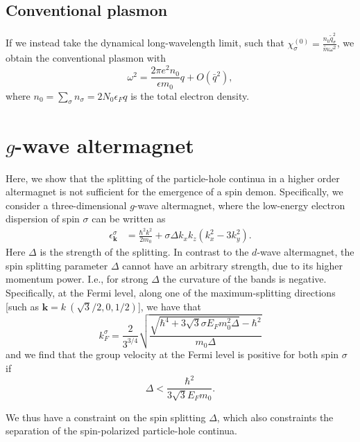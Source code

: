 \documentclass[aps,prb,reprint,twocolumns,superscriptaddress,nofootinbib]{revtex4-2}
\newcommand{\mdos}{\tilde{m}}
\newcommand{\kF}{k_{F}}
\begin{document}
	\subsection{Conventional plasmon}
	If we instead take the dynamical long-wavelength limit, such that $\chi_{\sigma}^{(0)}=\frac{n_0 \tilde q_\sigma^2}{\mdos \omega^2}$, we obtain the conventional plasmon with
	\begin{equation}
		\omega^2 = \frac{2\pi e^2n_0}{\epsilon m_0} q + O(\bar q^2),
	\end{equation}
	where $n_0=\sum_\sigma n_\sigma=2N_0\epsilon_Fq$ is the total electron density.
	
	
	
	\section{$g$-wave altermagnet}
	Here, we show that the splitting of the particle-hole continua in a higher order altermagnet is not sufficient for the emergence of a spin demon. Specifically, we consider a three-dimensional $g$-wave altermagnet, where the low-energy electron dispersion of spin $\sigma$ can be written as \cite{smejkalConventionalFerromagnetismAntiferromagnetism2022}
	\begin{align}
		\epsilon_{\bm k}^\sigma &= \frac{\hbar^2 k^2}{2m_0} + \sigma \Delta  k_xk_z\left(k_x^2-3k_y^2\right).
	\end{align}
	Here $\Delta$ is the strength of the splitting. In contrast to the $d$-wave altermagnet, the spin splitting parameter $\Delta$ cannot have an arbitrary strength, due to its higher momentum power. I.e., for strong $\Delta$ the curvature of the bands is negative. Specifically, at the Fermi level, along one of the maximum-splitting directions [such as $\bm k = k\  (\sqrt{3}/2,0,1/2)$], we have that 
	\begin{equation}
		\kF^\sigma = \frac{2}{3^{3/4}} \sqrt{\frac{\sqrt{\hbar^4+ 3\sqrt{3}\sigma E_Fm_0^2 \Delta  }-\hbar^2}{m_0 \Delta} } \label{eq:kF-g-wave}
	\end{equation}
	and we find that the group velocity at the Fermi level is positive for both spin $\sigma$ if
	\begin{equation}
		\Delta < \frac{\hbar^2}{3\sqrt{3}E_F m_0 }. \label{eq:delta-condition}
	\end{equation}
	
	We thus have a constraint on the spin splitting $\Delta$, which also constraints the separation of the spin-polarized particle-hole continua.  
	
\end{document}
